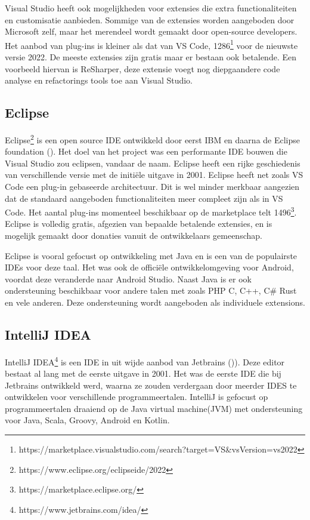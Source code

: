 Visual Studio heeft ook mogelijkheden voor extensies die extra functionaliteiten en customisatie aanbieden. Sommige van de extensies worden aangeboden door Microsoft zelf, maar het merendeel wordt gemaakt door open-source developers. Het aanbod van plug-ins is kleiner als dat van VS Code, 1286\footnote{https://marketplace.visualstudio.com/search?target=VS\&vsVersion=vs2022} voor de nieuwste versie 2022. De meeste extensies zijn gratis maar er bestaan ook betalende. Een voorbeeld hiervan is ReSharper, deze extensie voegt nog diepgaandere code analyse en refactorings tools toe aan Visual Studio.

\subsection{Eclipse}
Eclipse\footnote{https://www.eclipse.org/eclipseide/2022} is een open source IDE ontwikkeld door eerst IBM en daarna de Eclipse foundation (\textcite{Holzner2004}). Het doel van het project was een performante IDE bouwen die Visual Studio zou eclipsen, vandaar de naam. Eclipse heeft een rijke geschiedenis van verschillende versie met de initiële uitgave in 2001. Eclipse heeft net zoals VS Code een plug-in gebaseerde architectuur. Dit is wel minder merkbaar aangezien dat de standaard aangeboden functionaliteiten meer compleet zijn als in VS Code. Het aantal plug-ins momenteel beschikbaar op de marketplace telt 1496\footnote{https://marketplace.eclipse.org/}. Eclipse is volledig gratis, afgezien van bepaalde betalende extensies, en is mogelijk gemaakt door donaties vanuit de ontwikkelaars gemeenschap.

Eclipse is vooral gefocust op ontwikkeling met Java en is een van de populairste IDEs voor deze taal. Het was ook de officiële ontwikkelomgeving voor Android, voordat deze veranderde naar Android Studio. Naast Java is er ook ondersteuning beschikbaar voor andere talen met zoals PHP C, C++, C\# Rust en vele anderen. Deze ondersteuning wordt aangeboden als individuele extensions.

\newpage

\subsection{IntelliJ IDEA}
IntelliJ IDEA\footnote{https://www.jetbrains.com/idea/} is een IDE in uit wijde aanbod van Jetbrains ()\textcite{Krochmalski2014}). Deze editor bestaat al lang met de eerste uitgave in 2001. Het was de eerste IDE die bij Jetbrains ontwikkeld werd, waarna ze zouden verdergaan door meerder IDES te ontwikkelen voor verschillende programmeertalen. IntelliJ is gefocust op programmeertalen draaiend op de Java virtual machine(JVM) met ondersteuning voor Java, Scala, Groovy, Android en Kotlin.

